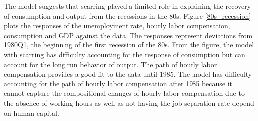 The model suggests that scarring played a limited role in explaining the recovery of consumption and output from the recessions in the 80s. Figure \ref{80s_recession} plots the responses of the unemployment rate, hourly labor compensation, consumption and GDP against the data. The responses represent deviations from 1980Q1, the beginning of the first recession of the 80s. From the figure, the model with scarring has difficulty accounting for the response of consumption but can account for the long run behavior of output. The path of hourly labor compensation provides a good fit to the data until 1985. The model has difficulty accounting for the path of hourly labor compensation after 1985 because it cannot capture the compositional changes of hourly labor compensation due to the absence of working hours as well as not having the job separation rate depend on human capital.  

